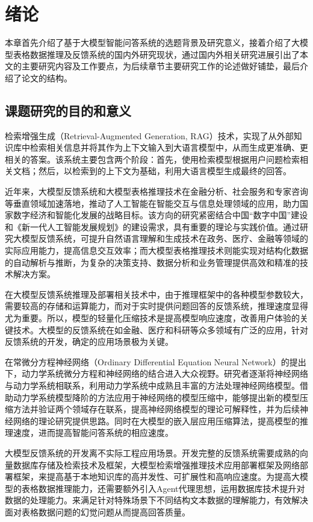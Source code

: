 \chapter{绪论}
\label{cha:intro}

本章首先介绍了基于大模型智能问答系统的选题背景及研究意义，接着介绍了大模型表格数据推理及反馈系统的国内外研究现状，通过国内外相关研究进展引出了本文的主要研究内容及工作要点，为后续章节主要研究工作的论述做好铺垫，最后介绍了论文的结构。
 
\section{课题研究的目的和意义}
检索增强生成（Retrieval-Augmented Generation, RAG）技术，实现了从外部知识库中检索相关信息并将其作为上下文输入到大语言模型中，从而生成更准确、更相关的答案。该系统主要包含两个阶段：首先，使用检索模型根据用户问题检索相关文档；然后，以检索到的上下文为基础，利用大语言模型生成最终的回答。

近年来，大模型反馈系统和大模型表格推理技术在金融分析、社会服务和专家咨询等垂直领域加速落地，推动了人工智能在智能交互与信息处理领域的应用，助力国家数字经济和智能化发展的战略目标。该方向的研究紧密结合中国“数字中国”建设和《新一代人工智能发展规划》的建设需求，具有重要的理论与实践价值。通过研究大模型反馈系统，可提升自然语言理解和生成技术在政务、医疗、金融等领域的实际应用能力，提高信息交互效率；而大模型表格推理技术则能实现对结构化数据的自动解析与推断，为复杂的决策支持、数据分析和业务管理提供高效和精准的技术解决方案。

在大模型反馈系统推理及部署相关技术中，由于推理框架中的各种模型参数较大，需要较高的存储和运算能力，而对于实时提供问题回答的反馈系统，推理速度显得尤为重要。所以，模型的轻量化压缩技术是提高模型响应速度，改善用户体验的关键技术。大模型的反馈系统在如金融、医疗和科研等众多领域有广泛的应用\cite{1024008988.nh,1024532352.nh,1024651093.nh,1024744443.nh,1024917032.nh}，针对反馈系统的开发，确定的应用场景极为关键。

在常微分方程神经网络（Ordinary Differential Equation Neural Network）\cite{chen2018neural}的提出下，动力学系统微分方程和神经网络的结合进入大众视野。研究者逐渐将神经网络与动力学系统相联系，利用动力学系统中成熟且丰富的方法处理神经网络模型。借助动力学系统模型降阶的方法应用于神经网络的模型压缩中，能够提出新的模型压缩方法并验证两个领域存在联系，提高神经网络模型的理论可解释性，并为后续神经网络的理论研究提供思路。同时在大模型的嵌入层应用压缩算法，提高模型的推理速度，进而提高智能问答系统的相应速度。

大模型反馈系统的开发离不实际工程应用场景。开发完整的反馈系统需要成熟的向量数据库存储及检索技术及框架，大模型检索增强推理技术应用部署框架及网络部署框架，来提高基于本地知识库的高并发性、可扩展性和高响应速度。为提高大模型的表格数据推理能力，还需要额外引入Agent代理思想，运用数据库技术提升对数据的处理能力。来满足针对特殊场景下不同结构文本数据的理解能力，有效解决面对表格数据问题的幻觉问题从而提高回答质量。

